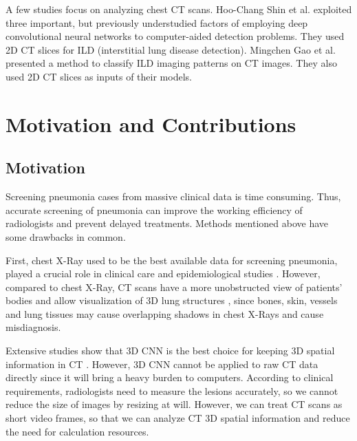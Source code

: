 \documentclass[journal]{IEEEtran}
\begin{document}
A few studies focus on analyzing chest CT scans. Hoo-Chang Shin et al. \cite{shin2016deep} exploited three important, but previously understudied factors of employing deep convolutional neural networks to computer-aided detection problems. They used 2D CT slices for ILD (interstitial lung disease detection). Mingchen Gao et al. \cite{gao2018holistic} presented a method to classify ILD imaging patterns on CT images. They also used 2D CT slices as inputs of their models.


\section{Motivation and Contributions}
\label{motiandcont}

\subsection{Motivation}

Screening pneumonia cases from massive clinical data is time consuming. Thus, accurate screening of pneumonia can improve the working efficiency of radiologists and prevent delayed treatments. Methods mentioned above have some drawbacks in common.

First, chest X-Ray used to be the best available data for screening pneumonia, played a crucial role in clinical care and epidemiological studies \cite{Franquet2001Imaging, Thomas2005Standardized}. 
However, compared to chest X-Ray, CT scans have a more unobstructed view of patients' bodies and allow visualization of 3D lung structures \cite{korfiatis2009texture}, since bones, skin, vessels and lung tissues may cause overlapping shadows in chest X-Rays and cause misdiagnosis. 

Extensive studies show that 3D CNN is the best choice for keeping 3D spatial information in CT \cite{Yorozu1987Electron}. However, 3D CNN cannot be applied to raw CT data directly since it will bring a heavy burden to computers. 
According to clinical requirements, radiologists need to measure the lesions accurately, so we cannot reduce the size of images by resizing at will. However, we can treat CT scans as short video frames, so that we can analyze CT 3D spatial information and reduce the need for calculation resources.
\end{document}
